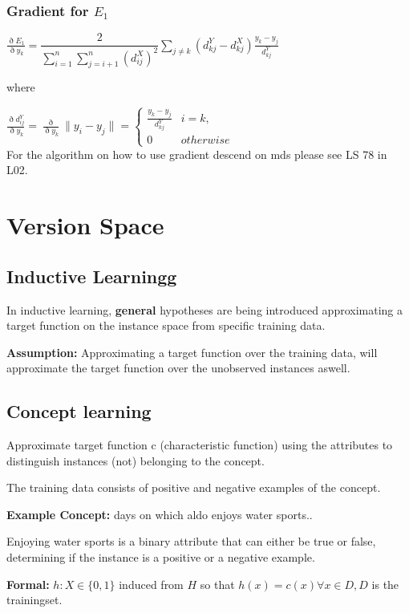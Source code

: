 \documentclass[fleqn, oneside, 10pt, titlepage]{article}
\begin{document}
\subsubsection{Gradient for $E_1$}
$\frac{\eth E_1}{\eth y_k} = \dfrac{2}{\sum_{i=1}^n \sum_{j=i+1}^n (d_{ij}^X)^2} \sum_{j \neq k} (d_{kj}^Y - d_{kj}^X) \frac{y_k - y_j}{d_{kj}^Y}$

where

$\frac{\eth d_{ij}^Y}{\eth y_k} = \frac{\eth}{\eth y_k} \|y_i - y_j \| = \left\lbrace \begin{array}{ll}
	\frac{y_k - y_j}{d_{kj}^Y} & i = k, \\
	0 & otherwise
\end{array}\right.$\\

For the algorithm on how to use gradient descend on mds please see LS 78 in L02.

\section{Version Space}
\subsection{Inductive Learningg}
In inductive learning, \textbf{general} hypotheses are being introduced approximating a target function on the instance space from specific training data.

\textbf{Assumption:} Approximating a target function over the training data, will approximate the target function over the unobserved instances aswell.

\subsection{Concept learning}
Approximate target function c (characteristic function) using the attributes to distinguish instances (not) belonging to the concept.

The training data consists of positive and negative examples of the concept.

\textbf{Example Concept:} days on which aldo enjoys water sports..

Enjoying water sports is a binary attribute that can either be true or false, determining if the instance is a positive or a negative example.

\textbf{Formal:} $h : X \in \{0,1\}$ induced from $H$ so that $h(x) = c(x) \forall x \in D, D $ is the trainingset.
\end{document}
